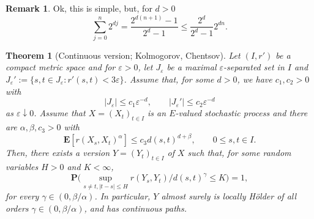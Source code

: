 \documentclass{article}
\newtheorem{theorem}{Theorem}
\theoremstyle{definition}
\newtheorem{remark}[proposition]{Remark}
\theoremstyle{step} \newtheorem{step}{Step}
\begin{document}
\begin{remark}
Ok, this is simple, but, for $d>0$
$$ \sum_{j=0}^n 2^{dj} = \frac{2^{d(n+1)}-1}{2^d-1} \leq \frac{2^d}{2^d-1}2^{dn}. $$
\end{remark}

\begin{theorem}[Continuous version; Kolmogorov, Chentsov]
  \label{T:kolchen_general}
  Let $(I, r')$ be a compact metric space and for $\varepsilon>0$, let $J_\varepsilon$ be a maximal $\varepsilon$-separated set in $I$ and $J_\varepsilon' := \{s,t \in J_\varepsilon: r'(s,t) < 3\varepsilon\}$. Assume that, for some $d>0$, we have $c_1, c_2>0$ with
  $$|J_\varepsilon| \leq c_1\varepsilon^{-d}, \qquad |J_\varepsilon'| \leq c_2 \varepsilon^{-d}$$
  as $\varepsilon \downarrow 0$. Assume that $X = (X_t)_{t\in I}$ is an $E$-valued stochastic process and there are $\alpha, \beta, c_3>0$ with
  $$ \mathbf E[r(X_s, X_t)^\alpha] \leq c_3 d(s,t)^{d+\beta}, \qquad 0\leq
    s,t\in I.$$ Then, there exists a version $Y = (Y_t)_{t\in I}$ of
  $X$ such that, for some random variables $H>0$ and $K<\infty$,
  $$ \mathbf P\Big(\sup_{s\neq t, |t-s| \leq H} r(Y_s,
    Y_t)/d(s,t)^\gamma \leq K\Big) = 1,
  $$ for every $\gamma\in(0,\beta/\alpha)$. In particular, $Y$ almost
  surely is locally Hölder of all orders $\gamma\in(0,\beta/\alpha)$,
  and has continuous paths.
\end{theorem}
\end{document}
